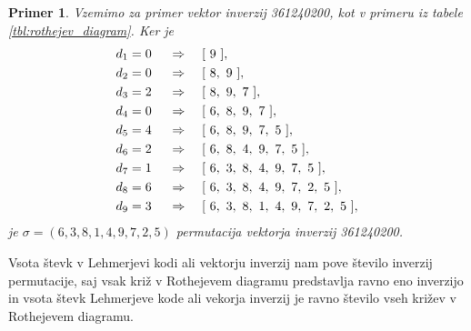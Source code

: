 \documentclass[a4paper, 12pt]{book}
\newtheorem{primer}{Primer}[chapter]
\begin{document}
\begin{primer}
\label{primer_vektor_inverzij_permutacija}
    Vzemimo za primer vektor inverzij 361240200, kot v primeru iz tabele \ref{tbl:rothejev_diagram}. Ker je
    \begin{align}
        &d_1 = 0& \ &\Rightarrow& \ &[ \ 9 \ ], \notag \\
        &d_2 = 0& \ &\Rightarrow& \ &[ \ 8, \ 9 \ ], \notag \\
        &d_3 = 2& \ &\Rightarrow& \ &[ \ 8, \ 9, \ 7 \ ], \notag \\
        &d_4 = 0& \ &\Rightarrow& \ &[ \ 6, \ 8, \ 9, \ 7 \ ], \notag \\
        &d_5 = 4& \ &\Rightarrow& \ &[ \ 6, \ 8, \ 9, \ 7, \ 5 \ ], \notag \\
        &d_6 = 2& \ &\Rightarrow& \ &[ \ 6, \ 8, \ 4, \ 9, \ 7, \ 5 \ ], \notag \\
        &d_7 = 1& \ &\Rightarrow& \ &[ \ 6, \ 3, \ 8, \ 4, \ 9, \ 7, \ 5 \ ], \notag \\
        &d_8 = 6& \ &\Rightarrow& \ &[ \ 6, \ 3, \ 8, \ 4, \ 9, \ 7, \ 2, \ 5 \ ], \notag \\
        &d_9 = 3& \ &\Rightarrow& \ &[ \ 6, \ 3, \ 8, \ 1, \ 4, \ 9, \ 7, \ 2, \ 5 \ ], \notag
    \end{align}
    je $\sigma = (6, 3, 8, 1, 4, 9, 7, 2, 5)$ permutacija vektorja inverzij 361240200.
\end{primer}

Vsota števk v Lehmerjevi kodi ali vektorju inverzij nam pove število inverzij permutacije, saj vsak križ v Rothejevem diagramu predstavlja ravno eno inverzijo in vsota števk Lehmerjeve kode ali vekorja inverzij je ravno število vseh križev v Rothejevem diagramu. 
\end{document}
